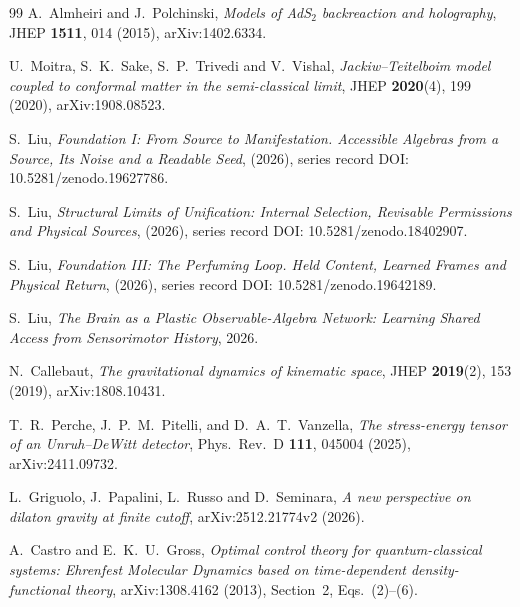 \begin{thebibliography}{99}
A.~Almheiri and J.~Polchinski, \emph{Models of AdS$_2$ backreaction and holography}, JHEP \textbf{1511}, 014 (2015), arXiv:1402.6334.

U.~Moitra, S.~K.~Sake, S.~P.~Trivedi and V.~Vishal, \emph{Jackiw--Teitelboim model coupled to conformal matter in the semi-classical limit}, JHEP \textbf{2020}(4), 199 (2020), arXiv:1908.08523.

S.~Liu, \emph{Foundation I: From Source to Manifestation. Accessible Algebras from a Source, Its Noise and a Readable Seed}, (2026), series record DOI: 10.5281/zenodo.19627786.

S.~Liu, \emph{Structural Limits of Unification: Internal Selection, Revisable Permissions and Physical Sources}, (2026),
series record DOI: 10.5281/zenodo.18402907.

S.~Liu, \emph{Foundation III: The Perfuming Loop. Held Content,
Learned Frames and Physical Return}, (2026),
series record DOI: 10.5281/zenodo.19642189.

S.~Liu, \emph{The Brain as a Plastic Observable-Algebra Network:
Learning Shared Access from Sensorimotor History}, 2026.

N.~Callebaut, \emph{The gravitational dynamics of kinematic space}, JHEP \textbf{2019}(2), 153 (2019), arXiv:1808.10431.

T.~R.~Perche, J.~P.~M.~Pitelli, and D.~A.~T.~Vanzella, \emph{The stress-energy tensor of an Unruh--DeWitt detector}, Phys.\ Rev.\ D \textbf{111}, 045004 (2025), arXiv:2411.09732.

L.~Griguolo, J.~Papalini, L.~Russo and D.~Seminara,
\emph{A new perspective on dilaton gravity at finite cutoff},
arXiv:2512.21774v2 (2026).

A.~Castro and E.~K.~U.~Gross,
\emph{Optimal control theory for quantum-classical systems: Ehrenfest
Molecular Dynamics based on time-dependent density-functional theory},
arXiv:1308.4162 (2013), Section~2, Eqs.~(2)--(6).

\end{thebibliography}

